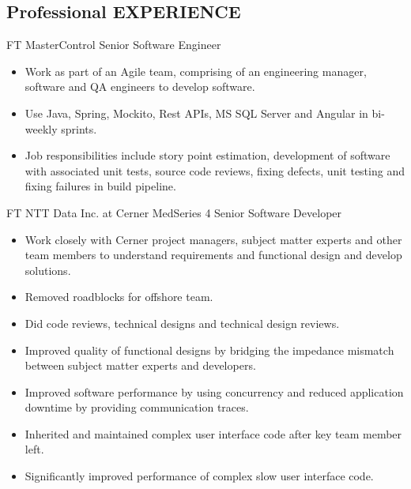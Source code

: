 \documentclass[10pt]{article} %
\begin{document}
\begin{paracol}{2}

\section{Professional EXPERIENCE}




{FT} %
{MasterControl} %
{Senior Software Engineer} %
{} %
\begin{itemize}
	\setlength\itemsep{0em}
	\item Work as part of an Agile team, comprising of an engineering manager, software and QA engineers to develop software.
	\item Use Java, Spring, Mockito, Rest APIs, MS SQL Server and Angular in bi-weekly sprints.
	\item Job responsibilities include story point estimation, development of software with associated unit tests, source code reviews, fixing defects, unit testing and fixing failures in build pipeline.
\end{itemize}

{FT} %
{NTT Data Inc. at Cerner MedSeries 4} %
{Senior Software Developer} %
{}\begin{itemize}
	\setlength\itemsep{0em}
	\item Work closely with Cerner project managers, subject matter experts and other team members to understand requirements and functional design and develop solutions. 
	\item Removed roadblocks for offshore team. 
	\item Did code reviews, technical designs and technical design reviews. 
	\item Improved quality of functional designs by bridging the impedance mismatch between subject matter experts and developers.
	\item Improved software performance by using concurrency and reduced application downtime by providing communication traces.
	\item	Inherited and maintained complex user interface code after key team member left. 
	\item Significantly improved performance of complex slow user interface code. %
\end{itemize}
\switchcolumn %



\end{paracol}
\end{document}
